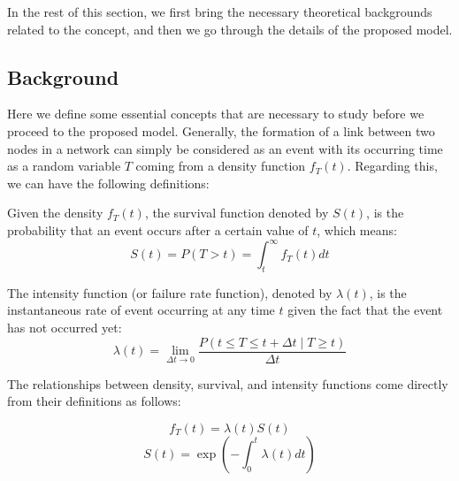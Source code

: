 In the rest of this section, we first bring the necessary theoretical backgrounds related to the concept, and then we go through the details of the proposed model.

\subsection{Background}
Here we define some essential concepts that are necessary to study before we proceed to the proposed model. Generally, the formation of a link between two nodes in a network can simply be considered as an event with its occurring time as a random variable $T$ coming from a density function $f_T(t)$. Regarding this, we can have the following definitions:

\begin{definition}
	Given the density $f_T(t)$, the survival function denoted by $S(t)$, is the probability that an event occurs after a certain value of $t$, which means:
	\begin{equation}
	S(t) = P(T > t) = \int_t^\infty f_T(t)dt
	\end{equation}
\end{definition}

\begin{definition}
	The intensity function (or failure rate function), denoted by $\lambda(t)$, is the instantaneous rate of event occurring at any time $t$ given the fact that the event has not occurred yet:
	\begin{equation}
	\lambda(t)=\lim_{\Delta t\rightarrow 0}\frac{P(t\le T\le t+\Delta t\mid T\ge t)}{\Delta t}
	\end{equation}
\end{definition}


The relationships between density, survival, and intensity functions come directly from their definitions as follows:

\begin{equation}\label{eq:intensity}
f_T(t)=\lambda(t){S(t)}
\end{equation}
\begin{equation}\label{eq:reliability}
S(t)=\exp(-\int_0^t\lambda(t)dt)
\end{equation}

